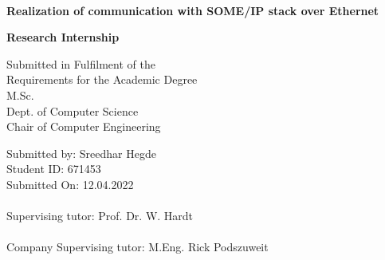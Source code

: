 \documentclass[a4paper, 12pt, oneside, BCOR1cm,toc=chapterentrywithdots]{scrbook}
\begin{document}
%
%

\begin{titlepage}

{
    \begin{center}
        \\
    \end{center}
    \vspace{0.5cm}
}

\begin{center}

\LARGE{\textbf{Realization of communication with SOME/IP stack over Ethernet}}\\
\vspace{1cm}

\Large{\textbf{Research Internship}}\\ 
\vspace{1cm}

Submitted in Fulfilment of the\\
Requirements for the Academic Degree\\
M.Sc.\\

\vspace{0.5cm}
Dept. of Computer Science\\
Chair of Computer Engineering\\

\end{center}
\vspace{0.6cm}
Submitted by: Sreedhar Hegde\\
Student ID: 671453\\
Submitted On: 12.04.2022\\
\vspace{0.5cm}\\
Supervising tutor: Prof. Dr. W. Hardt \\
\vspace{0.5cm}\\
Company Supervising tutor: M.Eng. Rick Podszuweit

\end{titlepage}
\end{document}
